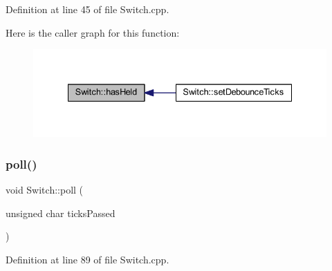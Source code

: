 Definition at line 45 of file Switch.\+cpp.

Here is the caller graph for this function\+:
\nopagebreak
\begin{figure}[H]
\begin{center}
\leavevmode
\includegraphics[width=335pt]{d9/d47/class_switch_a6cb0b78f23c412042b31ce8af317c718_icgraph}
\end{center}
\end{figure}
\mbox{\label{class_switch_a5401c79fd9fda679eae5e4bba5578a35}} 
\subsubsection{\texorpdfstring{poll()}{poll()}}
{\footnotesize\ttfamily void Switch\+::poll (\begin{DoxyParamCaption}\item[{unsigned char}]{ticks\+Passed }\end{DoxyParamCaption})}



Definition at line 89 of file Switch.\+cpp.

